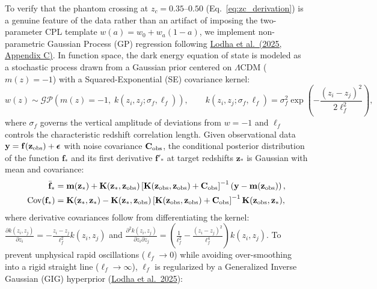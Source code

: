 \documentclass[11pt,letterpaper]{article}
\begin{document}
To verify that the phantom crossing at $z_c = 0.35\text{--}0.50$ (Eq.~\ref{eq:zc_derivation}) is a genuine feature of the data rather than an artifact of imposing the two-parameter CPL template $w(a) = w_0 + w_a(1-a)$, we implement non-parametric Gaussian Process (GP) regression following \href{https://arxiv.org/abs/2503.14743}{Lodha et al.\ (2025, Appendix C)}. In function space, the dark energy equation of state is modeled as a stochastic process drawn from a Gaussian prior centered on $\Lambda$CDM ($m(z) = -1$) with a Squared-Exponential (SE) covariance kernel:
\begin{equation}
    w(z) \sim \mathcal{GP}\!\left( m(z) = -1,\; k(z_i, z_j; \sigma_f, \ell_f) \right), \qquad k(z_i, z_j; \sigma_f, \ell_f) = \sigma_f^2 \exp\!\left( -\frac{(z_i - z_j)^2}{2 \ell_f^2} \right),
    \label{eq:gp_kernel}
\end{equation}
where $\sigma_f$ governs the vertical amplitude of deviations from $w=-1$ and $\ell_f$ controls the characteristic redshift correlation length. Given observational data $\mathbf{y} = \mathbf{f}(\mathbf{z}_{\rm obs}) + \boldsymbol{\epsilon}$ with noise covariance $\mathbf{C}_{\rm obs}$, the conditional posterior distribution of the function $\mathbf{f}_*$ and its first derivative $\mathbf{f}'_*$ at target redshifts $\mathbf{z}_*$ is Gaussian with mean and covariance:
\begin{align}
    \bar{\mathbf{f}}_* &= \mathbf{m}(\mathbf{z}_*) + \mathbf{K}(\mathbf{z}_*, \mathbf{z}_{\rm obs}) \left[ \mathbf{K}(\mathbf{z}_{\rm obs}, \mathbf{z}_{\rm obs}) + \mathbf{C}_{\rm obs} \right]^{-1} \left( \mathbf{y} - \mathbf{m}(\mathbf{z}_{\rm obs}) \right), \label{eq:gp_mean} \\
    \text{Cov}(\mathbf{f}_*) &= \mathbf{K}(\mathbf{z}_*, \mathbf{z}_*) - \mathbf{K}(\mathbf{z}_*, \mathbf{z}_{\rm obs}) \left[ \mathbf{K}(\mathbf{z}_{\rm obs}, \mathbf{z}_{\rm obs}) + \mathbf{C}_{\rm obs} \right]^{-1} \mathbf{K}(\mathbf{z}_{\rm obs}, \mathbf{z}_*), \label{eq:gp_cov}
\end{align}
where derivative covariances follow from differentiating the kernel: $\frac{\partial k(z_i, z_j)}{\partial z_i} = -\frac{z_i - z_j}{\ell_f^2} k(z_i, z_j)$ and $\frac{\partial^2 k(z_i, z_j)}{\partial z_i \partial z_j} = \left(\frac{1}{\ell_f^2} - \frac{(z_i - z_j)^2}{\ell_f^4}\right) k(z_i, z_j)$. To prevent unphysical rapid oscillations ($\ell_f \to 0$) while avoiding over-smoothing into a rigid straight line ($\ell_f \to \infty$), $\ell_f$ is regularized by a Generalized Inverse Gaussian (GIG) hyperprior (\href{https://arxiv.org/abs/2503.14743}{Lodha et al.\ 2025}):
\end{document}
